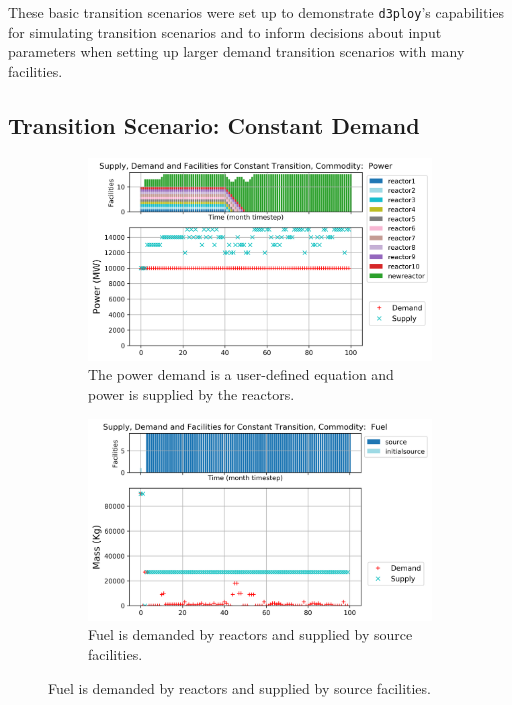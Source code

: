 \documentclass{anstrans}
\newcommand{\deploy}{\texttt{d3ploy}\xspace}%
\begin{document}
These basic transition scenarios were set up to 
demonstrate \deploy's capabilities for simulating 
transition scenarios and 
to inform decisions about input parameters when setting up larger 
demand transition scenarios with many facilities. 

\subsection{\textbf{Transition Scenario: Constant Demand}}


\begin{figure}[!htbp]
    \centering
    \begin{subfigure}[t]{\textwidth}
    \centering
        \includegraphics[width=0.8\linewidth]{figures/constanttransition-power.png} 
        \caption{The power demand is a user-defined equation and power is supplied by the reactors.}
        \label{fig:constanttransition-power}
    \end{subfigure}
    \begin{subfigure}[t]{0.65\textwidth}
        \centering
        \includegraphics[width=\linewidth]{figures/constanttransition-fuel.png} 
        \caption{Fuel is demanded by reactors and supplied by source facilities.}

\end{subfigure}
\end{figure}
\end{document}
